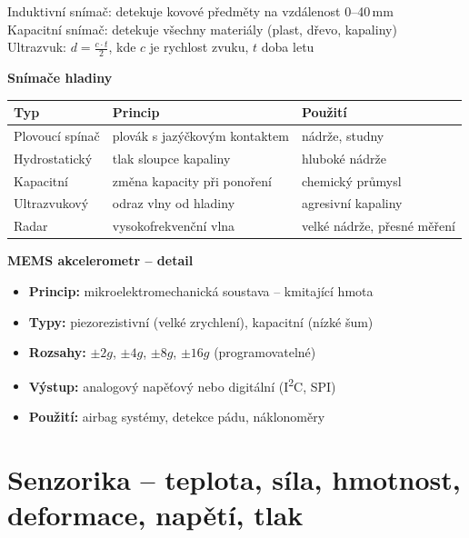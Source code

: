 \documentclass[a4paper,10pt]{article}
\begin{document}
\begin{vysvetlenibox}
\begin{vzorcebox}
Induktivní snímač: detekuje kovové předměty na vzdálenost 0--40\,mm\\
Kapacitní snímač: detekuje všechny materiály (plast, dřevo, kapaliny)\\
Ultrazvuk: $d = \frac{c \cdot t}{2}$, kde $c$ je rychlost zvuku, $t$ doba letu
\end{vzorcebox}

\textbf{Snímače hladiny}
\begin{center}
\begin{tabularx}{0.95\linewidth}{@{} l X l @{}}
    \toprule
    \textbf{Typ} & \textbf{Princip} & \textbf{Použití} \\
    \midrule
    Plovoucí spínač & plovák s jazýčkovým kontaktem & nádrže, studny \\
    Hydrostatický & tlak sloupce kapaliny & hluboké nádrže \\
    Kapacitní & změna kapacity při ponoření & chemický průmysl \\
    Ultrazvukový & odraz vlny od hladiny & agresivní kapaliny \\
    Radar & vysokofrekvenční vlna & velké nádrže, přesné měření \\
    \bottomrule
\end{tabularx}
\end{center}

\textbf{MEMS akcelerometr -- detail}
\begin{itemize}[noitemsep, leftmargin=1.4em, topsep=4pt]
    \item \textbf{Princip:} mikroelektromechanická soustava -- kmitající hmota
    \item \textbf{Typy:} piezorezistivní (velké zrychlení), kapacitní (nízké šum)
    \item \textbf{Rozsahy:} $\pm2g$, $\pm4g$, $\pm8g$, $\pm16g$ (programovatelné)
    \item \textbf{Výstup:} analogový napěťový nebo digitální (I\textsuperscript{2}C, SPI)
    \item \textbf{Použití:} airbag systémy, detekce pádu, náklonoměry
\end{itemize}
\end{vysvetlenibox}

\section{Senzorika -- teplota, síla, hmotnost, deformace, napětí, tlak}
\end{document}

